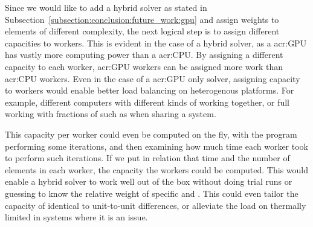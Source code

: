 Since we would like to add a hybrid solver as stated in
Subsection~\ref{subsection:conclusion:future_work:gpu} and assign weights to elements of different
complexity, the next logical step is to assign different capacities to workers. This is evident in
the case of a hybrid solver, as a \acrshort{acr:GPU} has vastly more computing power than a
\acrshort{acr:CPU}. By assigning a different capacity to each worker, \acrshort{acr:GPU} workers can
be assigned more work than \acrshort{acr:CPU} workers. Even in the case of a \acrshort{acr:GPU} only
solver, assigning capacity to workers would enable better load balancing on heterogenous platforms.
For example, different computers with different kinds of  working together, or
full  working with fractions of  such as when sharing a
system. 

This capacity per worker could even be computed on the fly, with the program performing some
iterations, and then examining how much time each worker took to perform such iterations. If we put
in relation that time and the number of elements in each worker, the capacity the workers could be
computed. This would enable a hybrid solver to work well out of the box without doing trial runs or
guessing to know the relative weight of specific  and . This
could even tailor the capacity of identical  to unit-to-unit differences, or
alleviate the load on thermally limited  in systems where it is an issue.
